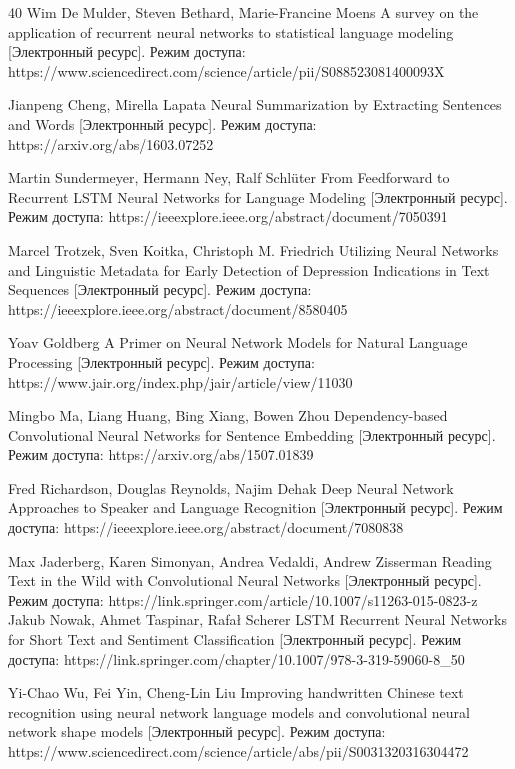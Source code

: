 \documentclass{article}
\begin{document}
\begin{thebibliography} {40}
Wim De Mulder, Steven Bethard, Marie-Francine Moens A survey on the application of recurrent neural networks to statistical language modeling [Электронный ресурс].
Режим доступа: https://www.sciencedirect.com/science/article/pii/S088523081400093X

Jianpeng Cheng, Mirella Lapata Neural Summarization by Extracting Sentences and Words [Электронный ресурс]. Режим доступа: https://arxiv.org/abs/1603.07252

Martin Sundermeyer, Hermann Ney, Ralf Schlüter From Feedforward to Recurrent LSTM Neural Networks for Language Modeling [Электронный ресурс].
Режим доступа: https://ieeexplore.ieee.org/abstract/document/7050391

Marcel Trotzek, Sven Koitka, Christoph M. Friedrich Utilizing Neural Networks and Linguistic Metadata for Early Detection of Depression Indications in Text Sequences [Электронный ресурс].
Режим доступа: https://ieeexplore.ieee.org/abstract/document/8580405

Yoav Goldberg A Primer on Neural Network Models for Natural Language Processing [Электронный ресурс].
Режим доступа: https://www.jair.org/index.php/jair/article/view/11030

Mingbo Ma, Liang Huang, Bing Xiang, Bowen Zhou Dependency-based Convolutional Neural Networks for Sentence Embedding [Электронный ресурс]. Режим доступа: https://arxiv.org/abs/1507.01839

Fred Richardson, Douglas Reynolds, Najim Dehak Deep Neural Network Approaches to Speaker and Language Recognition [Электронный ресурс]. Режим доступа: https://ieeexplore.ieee.org/abstract/document/7080838

Max Jaderberg, Karen Simonyan, Andrea Vedaldi, Andrew Zisserman Reading Text in the Wild with Convolutional Neural Networks [Электронный ресурс]. Режим доступа: https://link.springer.com/article/10.1007/s11263-015-0823-z
Jakub Nowak, Ahmet Taspinar, Rafał Scherer  LSTM Recurrent Neural Networks for Short Text and Sentiment Classification [Электронный ресурс]. Режим доступа: https://link.springer.com/chapter/10.1007/978-3-319-59060-8_50

Yi-Chao Wu, Fei Yin, Cheng-Lin Liu Improving handwritten Chinese text recognition using neural network language models and convolutional neural network shape models [Электронный ресурс]. Режим доступа: https://www.sciencedirect.com/science/article/abs/pii/S0031320316304472


\end{thebibliography}
\end{document}
